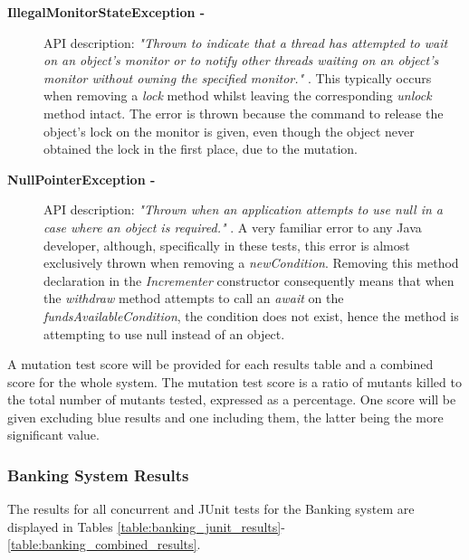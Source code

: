 \documentclass[a4paper,12pt]{article}
\begin{document}
\begin{description}
    \item[\textbf{IllegalMonitorStateException -}]API description: \textit{"Thrown to indicate that a thread has attempted to wait on an object's monitor or to notify other threads waiting on an object's monitor without owning the specified monitor."} \citep{imse18}. This typically occurs when removing a \textit{lock} method whilst leaving the corresponding \textit{unlock} method intact. The error is thrown because the command to release the object's lock on the monitor is given, even though the object never obtained the lock in the first place, due to the mutation. 

    \item[\textbf{NullPointerException - }] API description: \textit{"Thrown when an application attempts to use null in a case where an object is required."} \citep{npe18}. A very familiar error to any Java developer, although, specifically in these tests, this error is almost exclusively thrown when removing a \textit{newCondition}. Removing this method declaration in the \textit{Incrementer} constructor consequently means that when the \textit{withdraw} method attempts to call an \textit{await} on the \textit{fundsAvailableCondition}, the condition does not exist, hence the method is attempting to use null instead of an object.  
\end{description}

A mutation test score will be provided for each results table and a combined score for the whole system. The mutation test score is a ratio of mutants killed to the total number of mutants tested, expressed as a percentage. One score will be given excluding blue results and one including them, the latter being the more significant value. 

\subsubsection{Banking System Results} \label{section:Banking System Results}

The results for all concurrent and JUnit tests for the Banking system are displayed in Tables \ref{table:banking_junit_results}-\ref{table:banking_combined_results}. 
\end{document}

